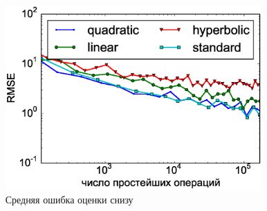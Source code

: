 \documentclass[unicode, notheorems]{beamer}
\begin{document}
\begin{frame}
\begin{columns}
\begin{column}{0.5\textwidth}
\begin{figure}[h]
            \end{figure}
        \end{column}
        \begin{column}{0.5\textwidth}
            \begin{figure}[h]
                \centering
                \includegraphics[width=\linewidth]{rmse_over_nop_lower_slides}
                \caption{Средняя ошибка оценки снизу}
                \label{fig:rmse_over_nop_random_subtree_slides}
            \end{figure}
        \end{column}
        
    \end{columns}
\end{frame}
\end{document}
